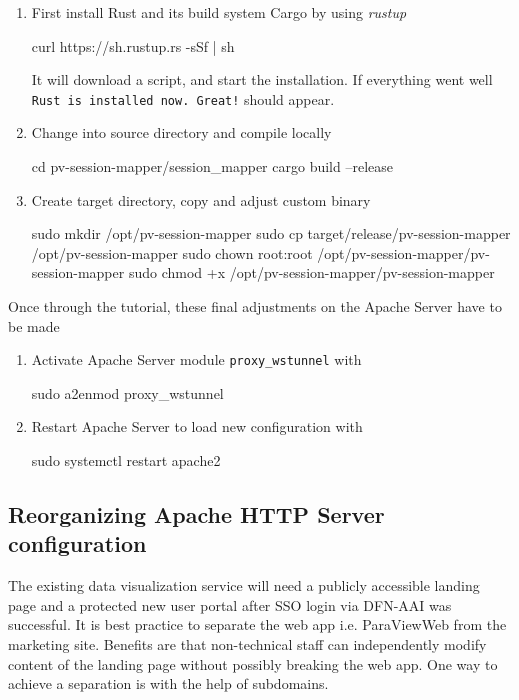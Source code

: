 \begin{enumerate}
    \item First install Rust and its build system Cargo by using \textit{rustup}
    \begin{terminal}
        curl https://sh.rustup.rs -sSf | sh
    \end{terminal}
    It will download a script, and start the installation. If everything went
    well \lstinline{Rust is installed now. Great!} should appear.
    \item Change into source directory and compile locally
    \begin{terminal}
        cd pv-session-mapper/session_mapper
        cargo build --release
    \end{terminal}
    \item Create target directory, copy and adjust custom binary
    \begin{terminal}
        sudo mkdir /opt/pv-session-mapper
        sudo cp target/release/pv-session-mapper /opt/pv-session-mapper
        sudo chown root:root /opt/pv-session-mapper/pv-session-mapper
        sudo chmod +x /opt/pv-session-mapper/pv-session-mapper
    \end{terminal}
\end{enumerate}

Once through the tutorial, these final adjustments on the Apache Server have to
be made

\begin{enumerate}
    \item Activate Apache Server module \lstinline{proxy_wstunnel} with 
    \begin{terminal}
        sudo a2enmod proxy_wstunnel
    \end{terminal}
    \item Restart Apache Server to load new configuration with
    \begin{terminal}
        sudo systemctl restart apache2
    \end{terminal}
\end{enumerate}

\subsection{Reorganizing Apache HTTP Server configuration}

The existing data visualization service will need a publicly accessible landing
page and a protected new user portal after SSO login via DFN-AAI was successful.
It is best practice to separate the web app i.e. ParaViewWeb from the marketing
site. Benefits are that non-technical staff can independently modify content of
the landing page without possibly breaking the web app. One way to achieve a
separation is with the help of subdomains. 

